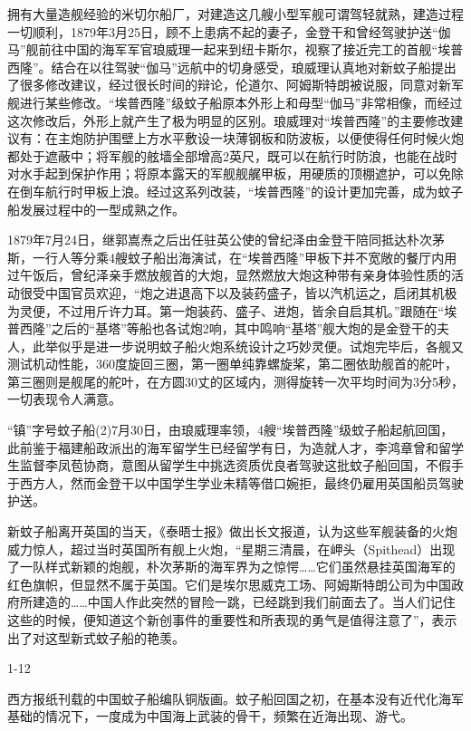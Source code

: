 \documentclass[12pt,UTF8]{ctexbook}
\begin{document}
拥有大量造舰经验的米切尔船厂，对建造这几艘小型军舰可谓驾轻就熟，建造过程一切顺利，1879年3月25日，顾不上患病不起的妻子，金登干和曾经驾驶护送“伽马”舰前往中国的海军军官琅威理一起来到纽卡斯尔，视察了接近完工的首舰“埃普西隆”。结合在以往驾驶“伽马”远航中的切身感受，琅威理认真地对新蚊子船提出了很多修改建议，经过很长时间的辩论，伦道尔、阿姆斯特朗被说服，同意对新军舰进行某些修改。“埃普西隆”级蚊子船原本外形上和母型“伽马”非常相像，而经过这次修改后，外形上就产生了极为明显的区别。琅威理对“埃普西隆”的主要修改建议有：在主炮防护围壁上方水平敷设一块薄钢板和防波板，以便使得任何时候火炮都处于遮蔽中；将军舰的舷墙全部增高2英尺，既可以在航行时防浪，也能在战时对水手起到保护作用；将原本露天的军舰舰艉甲板，用硬质的顶棚遮护，可以免除在倒车航行时甲板上浪。经过这系列改装，“埃普西隆”的设计更加完善，成为蚊子船发展过程中的一型成熟之作。

1879年7月24日，继郭嵩焘之后出任驻英公使的曾纪泽由金登干陪同抵达朴次茅斯，一行人等分乘4艘蚊子船出海演试，在“埃普西隆”甲板下并不宽敞的餐厅内用过午饭后，曾纪泽亲手燃放舰首的大炮，显然燃放大炮这种带有亲身体验性质的活动很受中国官员欢迎，“炮之进退高下以及装药盛子，皆以汽机运之，启闭其机极为灵便，不过用斤许力耳。第一炮装药、盛子、进炮，皆余自启其机。”跟随在“埃普西隆”之后的“基塔”等船也各试炮2响，其中鸣响“基塔”舰大炮的是金登干的夫人，此举似乎是进一步说明蚊子船火炮系统设计之巧妙灵便。试炮完毕后，各舰又测试机动性能，360度旋回三圈，第一圈单纯靠螺旋桨，第二圈依助舰首的舵叶，第三圈则是舰尾的舵叶，在方圆30丈的区域内，测得旋转一次平均时间为3分5秒，一切表现令人满意。

“镇”字号蚊子船(2)7月30日，由琅威理率领，4艘“埃普西隆”级蚊子船起航回国，此前鉴于福建船政派出的海军留学生已经留学有日，为造就人才，李鸿章曾和留学生监督李凤苞协商，意图从留学生中挑选资质优良者驾驶这批蚊子船回国，不假手于西方人，然而金登干以中国学生学业未精等借口婉拒，最终仍雇用英国船员驾驶护送。

新蚊子船离开英国的当天，《泰晤士报》做出长文报道，认为这些军舰装备的火炮威力惊人，超过当时英国所有舰上火炮，“星期三清晨，在岬头（Spithead）出现了一队样式新颖的炮舰，朴次茅斯的海军界为之惊愕……它们虽然悬挂英国海军的红色旗帜，但显然不属于英国。它们是埃尔思威克工场、阿姆斯特朗公司为中国政府所建造的……中国人作此突然的冒险一跳，已经跳到我们前面去了。当人们记住这些的时候，便知道这个新创事件的重要性和所表现的勇气是值得注意了”，表示出了对这型新式蚊子船的艳羡。

1-12

西方报纸刊载的中国蚊子船编队铜版画。蚊子船回国之初，在基本没有近代化海军基础的情况下，一度成为中国海上武装的骨干，频繁在近海出现、游弋。
\end{document}
